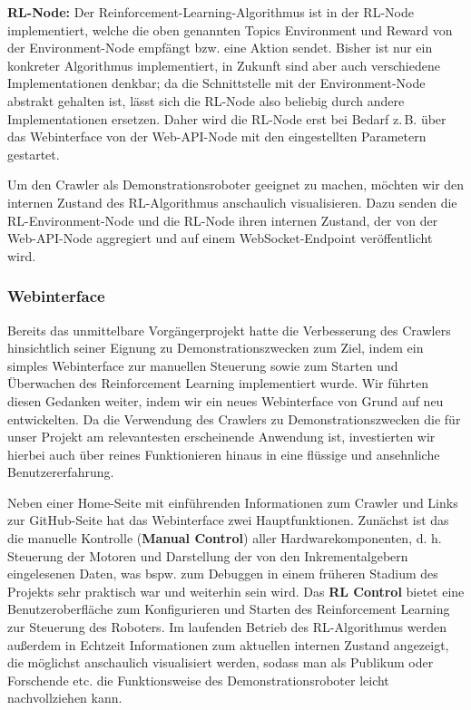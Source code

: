 \textbf{RL-Node:} Der Reinforcement-Learning-Algorithmus ist in der RL-Node implementiert, welche die oben genannten Topics Environment und Reward von der Environment-Node empfängt bzw. eine Aktion sendet. Bisher ist nur ein konkreter Algorithmus implementiert, in Zukunft sind aber auch verschiedene Implementationen denkbar; da die Schnittstelle mit der Environment-Node abstrakt gehalten ist, lässt sich die RL-Node also beliebig durch andere Implementationen ersetzen. Daher wird die RL-Node erst bei Bedarf z.\,B. über das Webinterface von der Web-API-Node mit den eingestellten Parametern gestartet.

Um den Crawler als Demonstrationsroboter geeignet zu machen, möchten wir den internen Zustand des RL-Algorithmus anschaulich visualisieren. Dazu senden die RL-Environment-Node und die RL-Node ihren internen Zustand, der von der Web-API-Node aggregiert und auf einem WebSocket-Endpoint veröffentlicht wird. 

\subsubsection{Webinterface}

Bereits das unmittelbare Vorgängerprojekt hatte die Verbesserung des Crawlers hinsichtlich seiner Eignung zu Demonstrationszwecken zum Ziel, indem ein simples Webinterface zur manuellen Steuerung sowie zum Starten und Überwachen des Reinforcement Learning implementiert wurde. Wir führten diesen Gedanken weiter, indem wir ein neues Webinterface von Grund auf neu entwickelten. Da die Verwendung des Crawlers zu Demonstrationszwecken die für unser Projekt am relevantesten erscheinende Anwendung ist, investierten wir hierbei auch über reines Funktionieren hinaus in eine flüssige und ansehnliche Benutzererfahrung. 

Neben einer Home-Seite mit einführenden Informationen zum Crawler und Links zur GitHub-Seite hat das Webinterface zwei Hauptfunktionen. Zunächst ist das die manuelle Kontrolle (\textbf{Manual Control}) aller Hardwarekomponenten, d. h. Steuerung der Motoren und Darstellung der von den Inkrementalgebern eingelesenen Daten, was bspw. zum Debuggen in einem früheren Stadium des Projekts sehr praktisch war und weiterhin sein wird. Das \textbf{RL Control} bietet eine Benutzeroberfläche zum Konfigurieren und Starten des Reinforcement Learning zur Steuerung des Roboters. Im laufenden Betrieb des RL-Algorithmus werden außerdem in Echtzeit Informationen zum aktuellen internen Zustand angezeigt, die möglichst anschaulich visualisiert werden, sodass man als Publikum oder Forschende etc. die Funktionsweise des Demonstrationsroboter leicht nachvollziehen kann.

